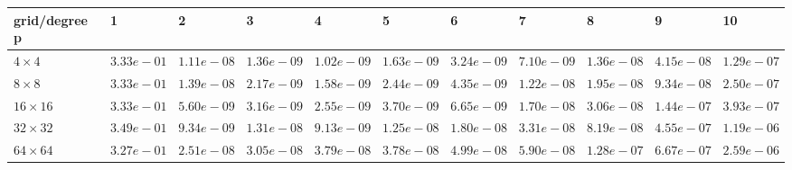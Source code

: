 \begin{tabular}{lllllllllll}
\hline
 grid/degree p   & 1          & 2          & 3          & 4          & 5          & 6          & 7          & 8          & 9          & 10         \\
\hline
 $4 \times 4$    & $3.33e-01$ & $1.11e-08$ & $1.36e-09$ & $1.02e-09$ & $1.63e-09$ & $3.24e-09$ & $7.10e-09$ & $1.36e-08$ & $4.15e-08$ & $1.29e-07$ \\
 $8 \times 8$    & $3.33e-01$ & $1.39e-08$ & $2.17e-09$ & $1.58e-09$ & $2.44e-09$ & $4.35e-09$ & $1.22e-08$ & $1.95e-08$ & $9.34e-08$ & $2.50e-07$ \\
 $16 \times 16$  & $3.33e-01$ & $5.60e-09$ & $3.16e-09$ & $2.55e-09$ & $3.70e-09$ & $6.65e-09$ & $1.70e-08$ & $3.06e-08$ & $1.44e-07$ & $3.93e-07$ \\
 $32 \times 32$  & $3.49e-01$ & $9.34e-09$ & $1.31e-08$ & $9.13e-09$ & $1.25e-08$ & $1.80e-08$ & $3.31e-08$ & $8.19e-08$ & $4.55e-07$ & $1.19e-06$ \\
 $64 \times 64$  & $3.27e-01$ & $2.51e-08$ & $3.05e-08$ & $3.79e-08$ & $3.78e-08$ & $4.99e-08$ & $5.90e-08$ & $1.28e-07$ & $6.67e-07$ & $2.59e-06$ \\
\hline
\end{tabular}